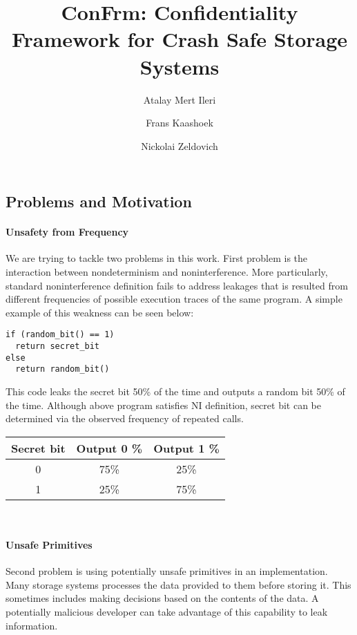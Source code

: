 \documentclass[onecolumn]{paper}
\title{ConFrm: Confidentiality Framework for Crash Safe Storage Systems}
\author{Atalay Mert Ileri \and Frans Kaashoek \and Nickolai Zeldovich}
\begin{document}
\maketitle


\subsection*{Problems and Motivation}
\paragraph{Unsafety from Frequency}
We are trying to tackle two problems in this work. First problem is the interaction between nondeterminism and noninterference. More particularly, standard noninterference definition fails to address leakages that is resulted from different frequencies of possible execution traces of the same program. A simple example of this weakness can be seen below:

\begin{lstlisting}
if (random_bit() == 1)
  return secret_bit
else
  return random_bit()
\end{lstlisting}

This code leaks the secret bit 50\% of the time and outputs a random bit 50\% of the time.
Although above program satisfies NI definition, secret bit can be determined via the observed frequency of repeated calls.\\

\begin{tabular}{| c | c | c |}
	\hline
	Secret bit & Output 0 \% & Output 1 \% \\
	\hline
	0 &	75\% & 25\% \\
	\hline
	1 &	25\% & 75\% \\
	\hline
\end{tabular}\\
 
\paragraph{Unsafe Primitives}
Second problem is using potentially unsafe primitives in an implementation. Many storage systems processes the data provided to them before storing it. This sometimes includes making decisions based on the contents of the data. A potentially malicious developer can take advantage of this capability to leak information.
\end{document}
